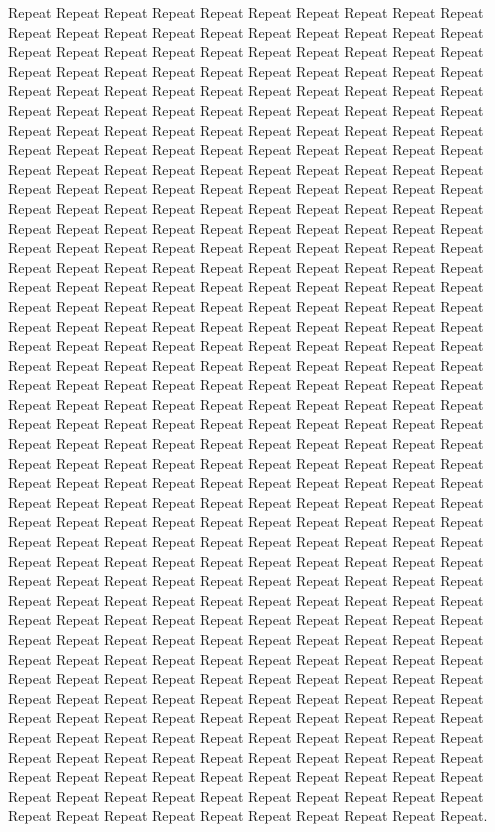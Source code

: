 \documentclass[journal]{IEEEtran}
\begin{document}
Repeat Repeat Repeat Repeat Repeat Repeat Repeat Repeat Repeat Repeat Repeat Repeat Repeat Repeat Repeat Repeat Repeat Repeat Repeat Repeat Repeat Repeat Repeat Repeat Repeat Repeat Repeat Repeat Repeat Repeat Repeat Repeat Repeat Repeat Repeat Repeat Repeat Repeat Repeat Repeat Repeat Repeat Repeat Repeat Repeat Repeat Repeat Repeat Repeat Repeat Repeat Repeat Repeat Repeat Repeat Repeat Repeat Repeat Repeat Repeat Repeat Repeat Repeat Repeat Repeat Repeat Repeat Repeat Repeat Repeat Repeat Repeat Repeat Repeat Repeat Repeat Repeat Repeat Repeat Repeat Repeat Repeat Repeat Repeat Repeat Repeat Repeat Repeat Repeat Repeat Repeat Repeat Repeat Repeat Repeat Repeat Repeat Repeat Repeat Repeat Repeat Repeat Repeat Repeat Repeat Repeat Repeat Repeat Repeat Repeat Repeat Repeat Repeat Repeat Repeat Repeat Repeat Repeat Repeat Repeat Repeat Repeat Repeat Repeat Repeat Repeat Repeat Repeat Repeat Repeat Repeat Repeat Repeat Repeat Repeat Repeat Repeat Repeat Repeat Repeat Repeat Repeat Repeat Repeat Repeat Repeat Repeat Repeat Repeat Repeat Repeat Repeat Repeat Repeat Repeat Repeat Repeat Repeat Repeat Repeat Repeat Repeat Repeat Repeat Repeat Repeat Repeat Repeat Repeat Repeat Repeat Repeat Repeat Repeat Repeat Repeat Repeat Repeat Repeat Repeat Repeat Repeat Repeat Repeat Repeat Repeat Repeat Repeat Repeat Repeat Repeat Repeat Repeat Repeat Repeat Repeat Repeat Repeat Repeat Repeat Repeat Repeat Repeat Repeat Repeat Repeat Repeat Repeat Repeat Repeat Repeat Repeat Repeat Repeat Repeat Repeat Repeat Repeat Repeat Repeat Repeat Repeat Repeat Repeat Repeat Repeat Repeat Repeat Repeat Repeat Repeat Repeat Repeat Repeat Repeat Repeat Repeat Repeat Repeat Repeat Repeat Repeat Repeat Repeat Repeat Repeat Repeat Repeat Repeat Repeat Repeat Repeat Repeat Repeat Repeat Repeat Repeat Repeat Repeat Repeat Repeat Repeat Repeat Repeat Repeat Repeat Repeat Repeat Repeat Repeat Repeat Repeat Repeat Repeat Repeat Repeat Repeat Repeat Repeat Repeat Repeat Repeat Repeat Repeat Repeat Repeat Repeat Repeat Repeat Repeat Repeat Repeat Repeat Repeat Repeat Repeat Repeat Repeat Repeat Repeat Repeat Repeat Repeat Repeat Repeat Repeat Repeat Repeat Repeat Repeat Repeat Repeat Repeat Repeat Repeat Repeat Repeat Repeat Repeat Repeat Repeat Repeat Repeat Repeat Repeat Repeat Repeat Repeat Repeat Repeat Repeat Repeat Repeat Repeat Repeat Repeat Repeat Repeat Repeat Repeat Repeat Repeat Repeat Repeat Repeat Repeat Repeat Repeat Repeat Repeat Repeat Repeat Repeat Repeat Repeat Repeat Repeat Repeat Repeat Repeat Repeat Repeat Repeat Repeat Repeat Repeat Repeat Repeat Repeat Repeat Repeat Repeat Repeat Repeat Repeat Repeat Repeat Repeat Repeat Repeat Repeat Repeat Repeat Repeat Repeat Repeat Repeat Repeat Repeat Repeat Repeat Repeat Repeat Repeat Repeat Repeat Repeat Repeat Repeat Repeat Repeat Repeat Repeat Repeat Repeat Repeat Repeat Repeat Repeat Repeat Repeat Repeat Repeat Repeat Repeat Repeat Repeat Repeat Repeat Repeat.
\end{document}
